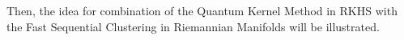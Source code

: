 \documentclass{article}
\begin{document}
Then, the idea for combination of 
the Quantum Kernel Method in RKHS with the
Fast Sequential Clustering in Riemannian Manifolds will be 
illustrated.
\end{document}
